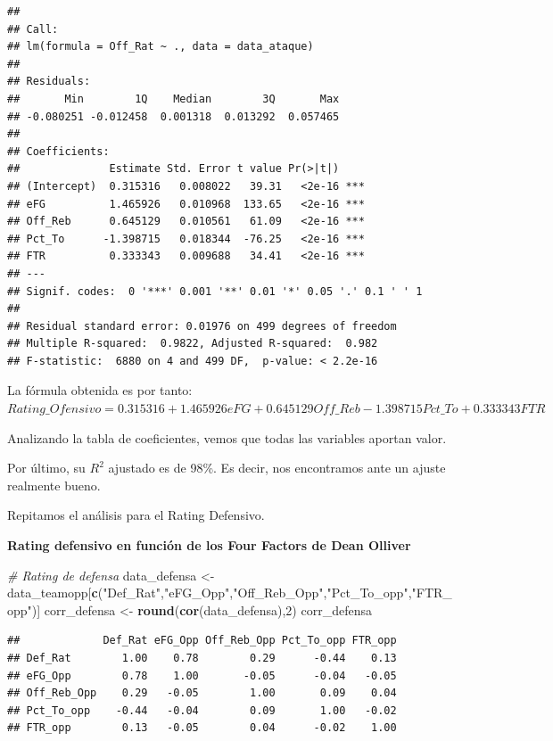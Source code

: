 \documentclass[
]{article}
\newenvironment{Shaded}{\begin{snugshade}}{\end{snugshade}}
\newcommand{\CommentTok}[1]{\textcolor[rgb]{0.56,0.35,0.01}{\textit{#1}}}
\newcommand{\DecValTok}[1]{\textcolor[rgb]{0.00,0.00,0.81}{#1}}
\newcommand{\KeywordTok}[1]{\textcolor[rgb]{0.13,0.29,0.53}{\textbf{#1}}}
\newcommand{\NormalTok}[1]{#1}
\newcommand{\StringTok}[1]{\textcolor[rgb]{0.31,0.60,0.02}{#1}}
\begin{document}
\begin{verbatim}
## 
## Call:
## lm(formula = Off_Rat ~ ., data = data_ataque)
## 
## Residuals:
##       Min        1Q    Median        3Q       Max 
## -0.080251 -0.012458  0.001318  0.013292  0.057465 
## 
## Coefficients:
##              Estimate Std. Error t value Pr(>|t|)    
## (Intercept)  0.315316   0.008022   39.31   <2e-16 ***
## eFG          1.465926   0.010968  133.65   <2e-16 ***
## Off_Reb      0.645129   0.010561   61.09   <2e-16 ***
## Pct_To      -1.398715   0.018344  -76.25   <2e-16 ***
## FTR          0.333343   0.009688   34.41   <2e-16 ***
## ---
## Signif. codes:  0 '***' 0.001 '**' 0.01 '*' 0.05 '.' 0.1 ' ' 1
## 
## Residual standard error: 0.01976 on 499 degrees of freedom
## Multiple R-squared:  0.9822, Adjusted R-squared:  0.982 
## F-statistic:  6880 on 4 and 499 DF,  p-value: < 2.2e-16
\end{verbatim}

La fórmula obtenida es por tanto:
\(Rating\_Ofensivo=0.315316+1.465926eFG+0.645129Off\_Reb-1.398715Pct\_To+0.333343FTR\)

Analizando la tabla de coeficientes, vemos que todas las variables
aportan valor.

Por último, su \(R^2\) ajustado es de 98\%. Es decir, nos encontramos
ante un ajuste realmente bueno.

Repitamos el análisis para el Rating Defensivo.

\textbf{Rating defensivo en función de los Four Factors de Dean Olliver}

\begin{Shaded}
\begin{Highlighting}[]
\CommentTok{# Rating de defensa}
\NormalTok{data_defensa <-}\StringTok{ }\NormalTok{data_teamopp[}\KeywordTok{c}\NormalTok{(}\StringTok{"Def_Rat"}\NormalTok{,}\StringTok{"eFG_Opp"}\NormalTok{,}\StringTok{"Off_Reb_Opp"}\NormalTok{,}\StringTok{"Pct_To_opp"}\NormalTok{,}\StringTok{"FTR_opp"}\NormalTok{)]}
\NormalTok{corr_defensa <-}\StringTok{ }\KeywordTok{round}\NormalTok{(}\KeywordTok{cor}\NormalTok{(data_defensa),}\DecValTok{2}\NormalTok{)}
\NormalTok{corr_defensa}
\end{Highlighting}
\end{Shaded}

\begin{verbatim}
##             Def_Rat eFG_Opp Off_Reb_Opp Pct_To_opp FTR_opp
## Def_Rat        1.00    0.78        0.29      -0.44    0.13
## eFG_Opp        0.78    1.00       -0.05      -0.04   -0.05
## Off_Reb_Opp    0.29   -0.05        1.00       0.09    0.04
## Pct_To_opp    -0.44   -0.04        0.09       1.00   -0.02
## FTR_opp        0.13   -0.05        0.04      -0.02    1.00
\end{verbatim}
\end{document}
